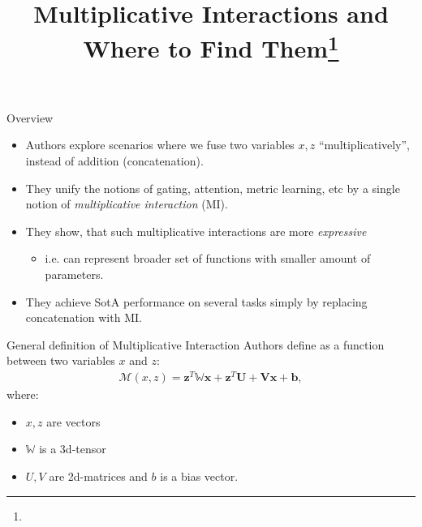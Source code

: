 \documentclass[10pt]{beamer}
\title{Multiplicative Interactions and Where to Find Them\footnote{\citepaper{MultiplicativeOps}}}
\begin{document}
\begin{frame}
    \titlepage
\end{frame}

\begin{frame}{Overview}
    \begin{itemize}
        \item\pause Authors explore scenarios where we fuse two variables $x, z$ ``multiplicatively'', instead of addition (concatenation).
        \item\pause They unify the notions of gating, attention, metric learning, etc by a single notion of \textit{multiplicative interaction} (MI).
        \item\pause They show, that such multiplicative interactions are more \textit{expressive}
        \begin{itemize}
            \item\pause i.e. can represent broader set of functions with smaller amount of parameters.
        \end{itemize}
        \item\pause They achieve SotA performance on several tasks simply by replacing concatenation with MI.
    \end{itemize}    
\end{frame}

\begin{frame}{General definition of Multiplicative Interaction}
Authors define  as a function between two variables $x$ and $z$:
\begin{align*}
\mathcal{M}(x, z) = \mathbf{z}^{T} \mathbb{W} \mathbf{x} + \mathbf{z}^{T} \mathbf{U}+\mathbf{V} \mathbf{x}+\mathbf{b},
\end{align*}
where:
\begin{itemize}
    \item $x, z$ are vectors
    \item $\mathbb{W}$ is a 3d-tensor
    \item $U, V$ are 2d-matrices and $b$ is a bias vector.
\end{itemize}
\end{frame}
\end{document}
